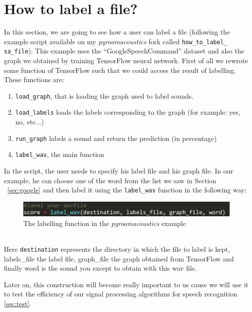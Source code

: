 \documentclass[11pt,a4paper,titlepage]{report}
\providecommand{\tightlist}{%
	\setlength{\itemsep}{0pt}\setlength{\parskip}{0pt}}
\begin{document}
\section{How to label a file?}
\label{sec:label_file}
\hspace*{0.6cm}
In this section, we are going to see how a user can label a file (following the example script available on my \textit{pyroomacoustics} fork called \texttt{how\_to\_label\_\\sa\_file}). This example uses the ``GoogleSpeechCommand'' dataset and also the graph we obtained by training TensorFlow neural network.
First of all we rewrote some function of TensorFlow such that we could access the result of labelling. These functions are:
\begin{enumerate}
	\tightlist
	\item \texttt{load\_graph}, that is loading the graph used to label sounds.
	\item \texttt{load\_labels} loads the labels corresponding to the graph (for example: yes, no, etc...)
	\item \texttt{run\_graph} labels a sound and return the prediction (in percentage)
	\item \texttt{label\_wav}, the main function
\end{enumerate}
\hspace*{0.6cm}
In the script, the user needs to specify his label file and his graph file. In our example, he can choose one of the word from the list we saw in Section ~\ref{sec:google} and then label it using the \texttt{label\_wav} function in the following way:
\begin{figure}[h!]
	\centering
	\includegraphics[width=0.7\linewidth]{Rapport8}
	\caption{The labelling function in the \textit{pyroomacoustics} example}
	\label{fig:rapport8}
\end{figure}\\

Here \texttt{destination} represents the directory in which the file to label is kept, labels\_file the label file, graph\_file the graph obtained from TensorFlow and finally word is the sound you except to obtain with this wav file.

Later on, this construction will become really important to us cause we will use it to test the efficiency of our signal processing algorithms for speech recognition \ref{sec:test}. 
\end{document}
